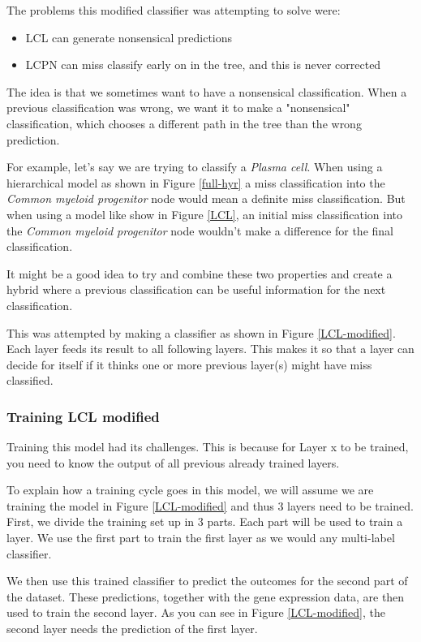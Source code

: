 \documentclass{article}
\begin{document}
The problems this modified classifier was attempting to solve were:
\begin{itemize}
    \item LCL can generate nonsensical predictions
    \item LCPN can miss classify early on in the tree, and this is never corrected
\end{itemize}

The idea is that we sometimes want to have a nonsensical classification. When a previous classification was wrong, we want it to make a "nonsensical" classification, which chooses a different path in the tree than the wrong prediction. 

For example, let's say we are trying to classify a \textit{Plasma cell}. When using a hierarchical model as shown in Figure \ref{full-hyr} a miss classification into the \textit{Common myeloid progenitor} node would mean a definite miss classification. But when using a model like show in Figure \ref{LCL}, an initial miss classification into the \textit{Common myeloid progenitor} node wouldn't make a difference for the final classification.

It might be a good idea to try and combine these two properties and create a hybrid where a previous classification can be useful information for the next classification.

This was attempted by making a classifier as shown in Figure \ref{LCL-modified}. Each layer feeds its result to all following layers. This makes it so that a layer can decide for itself if it thinks one or more previous layer(s) might have miss classified.

\subsubsection{Training LCL modified}
Training this model had its challenges. This is because for Layer x to be trained, you need to know the output of all previous already trained layers.

To explain how a training cycle goes in this model, we will assume we are training the model in Figure \ref{LCL-modified} and thus 3 layers need to be trained.
First, we divide the training set up in 3 parts. 
Each part will be used to train a layer.
We use the first part to train the first layer as we would any multi-label classifier.

We then use this trained classifier to predict the outcomes for the second part of the dataset. These predictions, together with the gene expression data, are then used to train the second layer. As you can see in Figure \ref{LCL-modified}, the second layer needs the prediction of the first layer.
\end{document}
